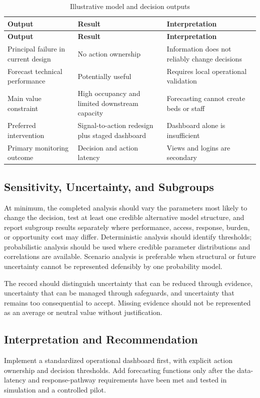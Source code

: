 \begin{longtable}{@{}p{}p{}p{}@{}}
\caption{Illustrative model and decision outputs}
\label{tab:comp-ch03-outputs}\\
\toprule
\textbf{Output} & \textbf{Result} & \textbf{Interpretation} \\
\midrule
\endfirsthead
\toprule
\textbf{Output} & \textbf{Result} & \textbf{Interpretation} \\
\midrule
\endhead
\bottomrule
\endlastfoot
Principal failure in current design & No action ownership & Information does not reliably change decisions \\
Forecast technical performance & Potentially useful & Requires local operational validation \\
Main value constraint & High occupancy and limited downstream capacity & Forecasting cannot create beds or staff \\
Preferred intervention & Signal-to-action redesign plus staged dashboard & Dashboard alone is insufficient \\
Primary monitoring outcome & Decision and action latency & Views and logins are secondary \\
\end{longtable}

\subsection{Sensitivity, Uncertainty, and Subgroups}
At minimum, the completed analysis should vary the parameters most likely to
change the decision, test at least one credible alternative model structure, and
report subgroup results separately where performance, access, response, burden,
or opportunity cost may differ. Deterministic analysis should identify thresholds;
probabilistic analysis should be used where credible parameter distributions and
correlations are available. Scenario analysis is preferable when structural or
future uncertainty cannot be represented defensibly by one probability model.

The record should distinguish uncertainty that can be reduced through evidence,
uncertainty that can be managed through safeguards, and uncertainty that remains
too consequential to accept. Missing evidence should not be represented as an
average or neutral value without justification.

\subsection{Interpretation and Recommendation}
Implement a standardized operational dashboard first, with explicit action ownership and decision thresholds. Add forecasting functions only after the data-latency and response-pathway requirements have been met and tested in simulation and a controlled pilot.

